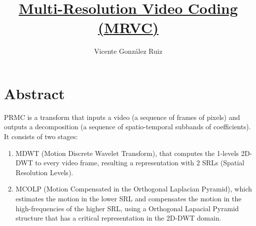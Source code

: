 

\title{\href{https://github.com/Sistemas-Multimedia/PRMC}{Multi-Resolution Video Coding (MRVC)}}

\author{Vicente González Ruiz}


\maketitle

\tableofcontents

\section*{Abstract}

PRMC is a transform that inputs a video (a sequence of frames of
pixels) and outputs a decomposition (a sequence of spatio-temporal
subbands of coefficients). It consists of two stages:

\begin{enumerate}
\item MDWT (Motion Discrete Wavelet Transform), that computes the
  1-levels 2D-DWT to every video frame, resulting a representation
  with $2$ SRLs (Spatial Resolution Levels).
\item MCOLP (Motion Compensated in the Orthogonal Laplacian Pyramid),
  which estimates the motion in the lower SRL and compensates the
  motion in the high-frequencies of the higher SRL, using a Orthogonal
  Lapacial Pyramid structure that has a critical representation in the
  2D-DWT domain.
\end{enumerate}


